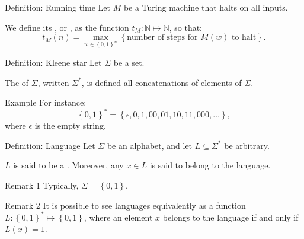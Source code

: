 \documentclass[a4paper]{article}
\begin{document}
\begin{parag}{Definition: Running time}
    Let $M$ be a Turing machine that halts on all inputs.

    We define its , or , as the function $t_M: \mathbb{N} \mapsto \mathbb{N}$, so that: 
    \[t_M\left(n\right) = \max_{w \in \left\{0, 1\right\}^n} \left\{\text{number of steps for $M\left(w\right)$ to halt}\right\}.\]
\end{parag}

\begin{parag}{Definition: Kleene star}
    Let $\Sigma$ be a set.

    The  of $\Sigma$, written $\Sigma^*$, is defined all concatenations of elements of $\Sigma$. 

    \begin{subparag}{Example}
        For instance: 
        \[\left\{0, 1\right\}^* = \left\{\epsilon, 0, 1, 00, 01, 10, 11, 000, \ldots\right\},\]
        where $\epsilon$ is the empty string.
    \end{subparag}
\end{parag}

\begin{parag}{Definition: Language}
    Let $\Sigma$ be an alphabet, and let $L \subseteq \Sigma^*$ be arbitrary.

    $L$ is said to be a . Moreover, any $x \in L$ is said to belong to the language.

    \begin{subparag}{Remark 1}
        Typically, $\Sigma = \left\{0, 1\right\}$.
    \end{subparag}

    \begin{subparag}{Remark 2}
        It is possible to see languages equivalently as a function $L: \left\{0, 1\right\}^* \mapsto \left\{0, 1\right\}$, where an element $x$ belongs to the language if and only if $L\left(x\right) = 1$.
    \end{subparag}
\end{parag}
\end{document}
